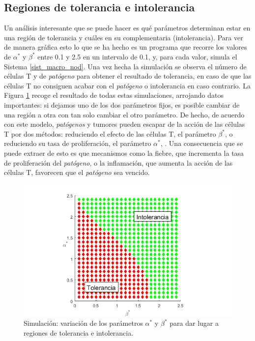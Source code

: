 \subsection{Regiones de tolerancia e intolerancia}

Un análisis interesante que se puede hacer es qué parámetros determinan estar en una región de tolerancia y cuáles en su complementaria (intolerancia). Para ver de manera gráfica esto lo que se ha hecho es un programa que recorre los valores de $\alpha^{*}$ y $\beta^{*}$ entre 0.1 y 2.5 en un intervalo de 0.1, y, para cada valor, simula el Sistema \ref{sist_macro_nod}. Una vez hecha la simulación se observa el número de células T y de \textit{patógeno} para obtener el resultado de tolerancia, en caso de que las células T no consiguen acabar con el \textit{patógeno} o intolerancia en caso contrario. La Figura \ref{fig:macro_toler_intoler} recoge el resultado de todas estas simulaciones, arrojando datos importantes: si dejamos uno de los dos parámetros fijos, es posible cambiar de una región a otra con tan solo cambiar el otro parámetro. De hecho, de acuerdo con este modelo, \textit{patógenos} y tumores pueden escapar de la acción de las células T por dos métodos: reduciendo el efecto de las células T, el parámetro $\beta^{*}$, o reduciendo su tasa de proliferación, el parámetro $\alpha^{*}$, \citep{arias2016emergent}. Una consecuencia que se puede extraer de esto es que mecanismos como la fiebre, que incrementa la tasa de proliferación del \textit{patógeno}, o la inflamación, que aumenta la acción de las células T, favorecen que el \textit{patógeno} sea vencido. 

\begin{figure}[t]
	\centering
	\includegraphics[width=1\textwidth]{Imagenes/Simulaciones/macro_toler_intoler}
	\caption{Simulación: variación de los parámetros $\alpha^{*}$ y $\beta^{*}$ para dar lugar a regiones de tolerancia e intolerancia.}
	\label{fig:macro_toler_intoler}
\end{figure}
